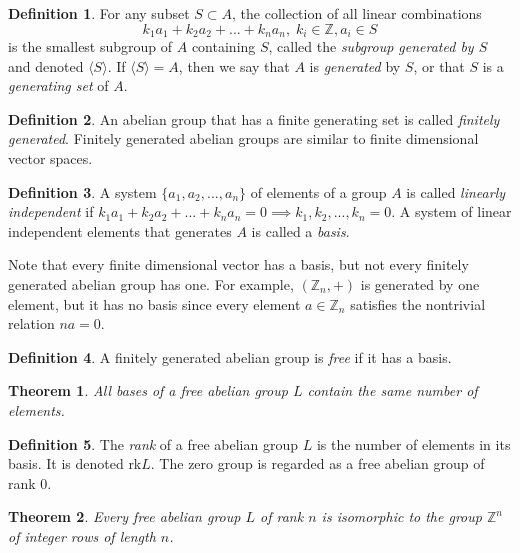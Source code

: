 \documentclass{article}
\newtheorem{theorem}{Theorem}[section]
\theoremstyle{remark}
\theoremstyle{definition}
\newtheorem{definition}{Definition}[section]
\begin{document}
\begin{definition}
For any subset $S \subset A$, the collection of all linear combinations 
\[k_1 a_1 + k_2 a_2 + ... + k_n a_n, \; k_i \in \mathbb{Z}, a_i \in S\]
is the smallest subgroup of $A$ containing $S$, called the \textit{subgroup generated by $S$} and denoted $\langle S \rangle$. If $\langle S \rangle = A$, then we say that $A$ is \textit{generated} by $S$, or that $S$ is a \textit{generating set} of $A$. 
\end{definition}

\begin{definition}
An abelian group that has a finite generating set is called \textit{finitely generated}. Finitely generated abelian groups are similar to finite dimensional vector spaces. 
\end{definition}

\begin{definition}
A system $\{ a_1, a_2, ..., a_n\}$ of elements of a group $A$ is called \textit{linearly independent} if $k_1 a_1 + k_2 a_2 + ... + k_n a_n = 0 \implies k_1, k_2, ..., k_n = 0$. A system of linear independent elements that generates $A$ is called a \textit{basis}. 
\end{definition}

Note that every finite dimensional vector has a basis, but not every finitely generated abelian group has one. For example, $(\mathbb{Z}_n, +)$ is generated by one element, but it has no basis since every element $a \in \mathbb{Z}_n$ satisfies the nontrivial relation $n a = 0$. 
\begin{definition}
A finitely generated abelian group is \textit{free} if it has a basis. 
\end{definition}

\begin{theorem}
All bases of a free abelian group $L$ contain the same number of elements. 
\end{theorem}

\begin{definition}
The \textit{rank} of a free abelian group $L$ is the number of elements in its basis. It is denoted rk$L$. The zero group is regarded as a free abelian group of rank $0$. 
\end{definition}

\begin{theorem}
Every free abelian group $L$ of rank $n$ is isomorphic to the group $\mathbb{Z}^n$ of integer rows of length $n$. 
\end{theorem}
\end{document}
